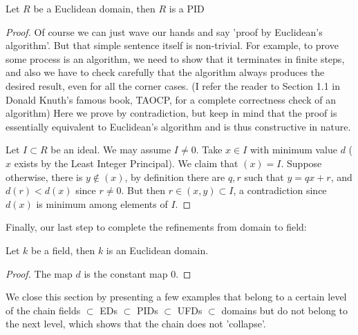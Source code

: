 \documentclass{note-eng}
\begin{document}
\begin{proposition}
    Let $R$ be a Euclidean domain, then $R$ is a PID
\end{proposition}

\begin{proof}
    Of course we can just wave our hands and say 'proof by Euclidean's algorithm'. But that simple sentence itself is non-trivial. For example, to prove some process is an algorithm, we need to show that it terminates in finite steps, and also we have to check carefully that the algorithm always produces the desired result, even for all the corner cases. (I refer the reader to Section 1.1 in Donald Knuth's famous book, TAOCP, for a complete correctness check of an algorithm) Here we prove by contradiction, but keep in mind that the proof is essentially equivalent to Euclidean's algorithm and is thus constructive in nature. 

    Let $I \subset R$ be an ideal. We may assume $I \ne 0$. Take $x \in I$ with minimum value $d$ ($x$ exists by the Least Integer Principal). We claim that $(x) = I$. Suppose otherwise, there is $y \notin (x)$, by definition there are $q, r$ such that $y = qx + r$, and $d(r) \lt d(x)$ since $r \ne 0$. But then $r \in (x, y) \subset I$, a contradiction since $d(x)$ is minimum among elements of $I$.
\end{proof}

Finally, our last step to complete the refinements from domain to field:

\begin{proposition}
    Let $k$ be a field, then $k$ is an Euclidean domain.
\end{proposition}

\begin{proof}
    The map $d$ is the constant map $0$.
\end{proof}

We close this section by presenting a few examples that belong to a certain level of the chain fields $\subset$ EDs $\subset$ PIDs $\subset$ UFDs $\subset$ domains but do not belong to the next level, which shows that the chain does not 'collapse'.
\end{document}
